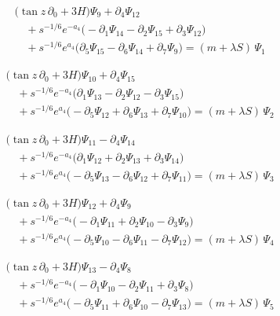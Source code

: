 \documentclass[11pt]{article}
\begin{document}
\[
\begin{aligned}
&\bigl(\tan z\,\partial_{0}+3H\bigr)\Psi_{9}+\partial_{4}\Psi_{12} \\
&\quad +s^{-1/6}e^{-a_4}\bigl(-\partial_{1}\Psi_{14}-\partial_{2}\Psi_{15}+\partial_{3}\Psi_{12}\bigr) \\
&\quad +s^{-1/6}e^{a_4}\bigl(\partial_{5}\Psi_{15}-\partial_{6}\Psi_{14}+\partial_{7}\Psi_{9}\bigr)=(m+\lambda S)\,\Psi_{1}
\end{aligned}\tag{E1}
\]

\[
\begin{aligned}
&\bigl(\tan z\,\partial_{0}+3H\bigr)\Psi_{10}+\partial_{4}\Psi_{15} \\
&\quad +s^{-1/6}e^{-a_4}\bigl(\partial_{1}\Psi_{13}-\partial_{2}\Psi_{12}-\partial_{3}\Psi_{15}\bigr) \\
&\quad +s^{-1/6}e^{a_4}\bigl(-\partial_{5}\Psi_{12}+\partial_{6}\Psi_{13}+\partial_{7}\Psi_{10}\bigr)=(m+\lambda S)\,\Psi_{2}
\end{aligned}\tag{E2}
\]

\[
\begin{aligned}
&\bigl(\tan z\,\partial_{0}+3H\bigr)\Psi_{11}-\partial_{4}\Psi_{14} \\
&\quad +s^{-1/6}e^{-a_4}\bigl(\partial_{1}\Psi_{12}+\partial_{2}\Psi_{13}+\partial_{3}\Psi_{14}\bigr) \\
&\quad +s^{-1/6}e^{a_4}\bigl(-\partial_{5}\Psi_{13}-\partial_{6}\Psi_{12}+\partial_{7}\Psi_{11}\bigr)=(m+\lambda S)\,\Psi_{3}
\end{aligned}\tag{E3}
\]

\[
\begin{aligned}
&\bigl(\tan z\,\partial_{0}+3H\bigr)\Psi_{12}+\partial_{4}\Psi_{9} \\
&\quad +s^{-1/6}e^{-a_4}\bigl(-\partial_{1}\Psi_{11}+\partial_{2}\Psi_{10}-\partial_{3}\Psi_{9}\bigr) \\
&\quad +s^{-1/6}e^{a_4}\bigl(-\partial_{5}\Psi_{10}-\partial_{6}\Psi_{11}-\partial_{7}\Psi_{12}\bigr)=(m+\lambda S)\,\Psi_{4}
\end{aligned}\tag{E4}
\]

\[
\begin{aligned}
&\bigl(\tan z\,\partial_{0}+3H\bigr)\Psi_{13}-\partial_{4}\Psi_{8} \\
&\quad +s^{-1/6}e^{-a_4}\bigl(-\partial_{1}\Psi_{10}-\partial_{2}\Psi_{11}+\partial_{3}\Psi_{8}\bigr) \\
&\quad +s^{-1/6}e^{a_4}\bigl(-\partial_{5}\Psi_{11}+\partial_{6}\Psi_{10}-\partial_{7}\Psi_{13}\bigr)=(m+\lambda S)\,\Psi_{5}
\end{aligned}\tag{E5}
\]
\end{document}

